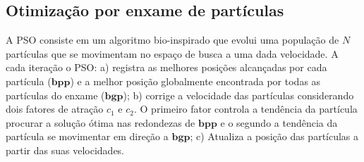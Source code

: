 \begin{comment}
\begin{algorithm}[ht]
\caption{Differential evolution optimization}
\label{alg:de}
\begin{algorithmic}
\Require $N\text{,}\:M > 0$, $\:\beta\text{,}\:P_r \in (0,1]$, $\:COST$
\Ensure The best found solution that minimizes $COST$
\For{$i = 0,\:1,\:\cdots,\:N-1$}
\For{$j = 0,\:1,\:\cdots,\:M-1$}
\State $\boldsymbol{pop}[i][j] \gets U(0.125,125.0)$
\EndFor
\EndFor

\For{$j = 0,\:1,\:\cdots,\:1250$}
\For{$i = 0,\:1,\:\cdots,\:N-1$}
\State Select in $\boldsymbol{pop}$ three random distinct candidate solutions ($\boldsymbol{\sigma_a}$, $\boldsymbol{\sigma_b}$ and $\boldsymbol{\sigma_c}$) that differ from $\boldsymbol{pop}[i]$
\State $\boldsymbol{d} \gets \boldsymbol{\sigma_a} + \beta.(\boldsymbol{\sigma_b} - \boldsymbol{\sigma_c})$
\For{$k = 0,\:1,\:\cdots,\:M-1$}
\If{$\boldsymbol{d}[k] \notin [0.125,125.0]$}
\State $\boldsymbol{d}[k] \gets U(0.125,125.0)$
\EndIf
\EndFor
\State $\boldsymbol{c} \gets \boldsymbol{pop}[i]$
\State $k \gets U(0,M-1)$
\State $c[k] \gets d[k]$
\For{$k = 0,\:1,\:\cdots,\:M-1$}
\If {$U(0,1) \leq P_r$}
  \State $c[k] \gets d[k]$
\EndIf
\EndFor

\If {\Call{$COST$}{$\boldsymbol{c}$} $<$ \Call{$COST$}{$\boldsymbol{pop}[i]$}}
 \State $\boldsymbol{pop}[i] \gets \boldsymbol{c}$
\EndIf
\EndFor
\EndFor
\end{algorithmic}
\end{algorithm}
\end{comment}

\subsection{Otimização por enxame de partículas}
 A \acf{PSO} consiste em um algoritmo bio-inspirado que evolui uma população de $N$ partículas que se movimentam no espaço de busca a uma dada velocidade. A cada iteração o \ac{PSO}: a) registra as melhores posições alcançadas por cada partícula ($\mathbf{bpp}$) e a melhor posição globalmente encontrada por todas as partículas do enxame ($\mathbf{bgp}$); b) corrige a velocidade das partículas considerando dois fatores de atração $c_1$ e $c_2$. O primeiro fator controla a tendência da partícula procurar a solução ótima nas redondezas de $\mathbf{bpp}$ e o segundo a tendência da partícula se movimentar em direção a $\mathbf{bgp}$; c) Atualiza a posição das partículas a partir das suas velocidades.
 
